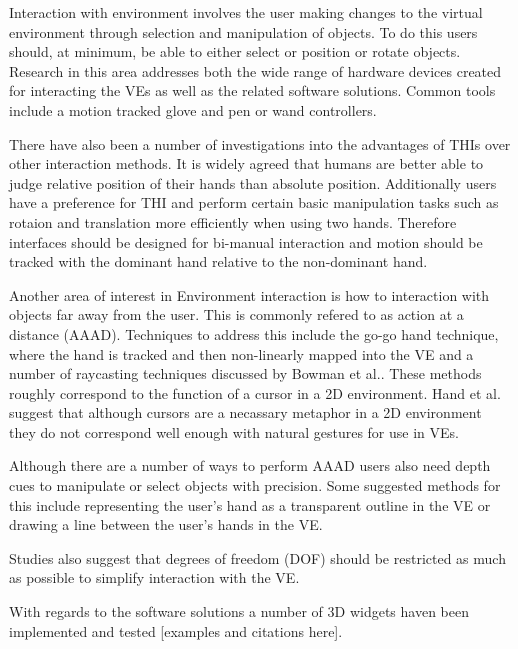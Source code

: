 \documentclass{sig-alternate-05-2015}
\begin{document}
 Interaction with environment involves the user making changes to the virtual environment through selection and manipulation of objects. To do this users should, at minimum, be able to either select or position or rotate objects\cite{Bowman2001}. Research in this area addresses both the wide range of hardware devices created for interacting the VEs as well as the related software solutions. Common tools include a motion tracked glove \cite{Zimmerman1986} and pen or wand controllers.\cite{Schultheis2012}
 
 There have also been a number of investigations into the advantages of THIs over other interaction methods. It is widely agreed that humans are better able to judge relative position of their hands than absolute position.\cite{Bowman1998, Buxton1986} Additionally users have a preference for THI\cite{Buxton1986} and perform certain basic manipulation tasks such as rotaion and translation more efficiently when using two hands.\cite{Schultheis2012} Therefore interfaces should be designed for bi-manual interaction and motion should be tracked with the dominant hand relative to the non-dominant hand.\cite{Hinckley1994}
 
 Another area of interest in Environment interaction is how to interaction with objects far away from the user. This is commonly refered to as action at a distance (AAAD). Techniques to address this include the go-go hand technique\cite{Poupyrev1996}, where the hand is tracked and then non-linearly mapped into the VE and a number of raycasting techniques discussed by Bowman et al.\cite{Bowman2001}. These methods roughly correspond to the function of a cursor in a 2D environment. Hand et al. suggest that although cursors are a necassary metaphor in a 2D environment they do not correspond well enough with natural gestures for use in VEs.\cite{Hand1997}
 
 Although there are a number of ways to perform AAAD users also need depth cues to manipulate or select objects with precision.\cite{Schultheis2012} Some suggested methods for this include representing the user's hand as a transparent outline in the VE\cite{Hinckley1994} or drawing a line between the user's hands in the VE.\cite{Schultheis2012}
 
 
 Studies also suggest that degrees of freedom (DOF) should be restricted as much as possible to simplify interaction with the VE.\cite{Bowman2001}
 
 
  With regards to the software solutions a number of 3D widgets haven been implemented and tested [examples and citations here].
 
\end{document}
